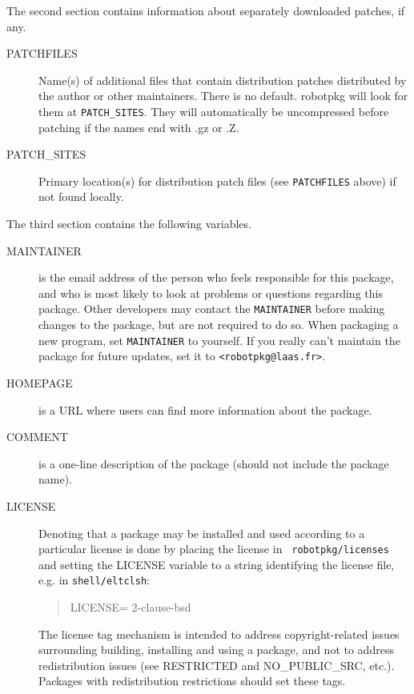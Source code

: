 The second section contains information about separately downloaded patches, if any.

\begin{description}

   \item[PATCHFILES] Name(s) of additional files that contain distribution
   patches distributed by the author or other maintainers. There is no
   default. robotpkg will look for them at {\tt    PATCH\_SITES}. They will
   automatically be uncompressed before patching if    the names end with .gz
   or .Z.

   \item[PATCH\_SITES] Primary location(s) for distribution patch files (see
   {\tt PATCHFILES} above) if not found locally.

\end{description}

The third section contains the following variables.

\begin{description}

   \item[MAINTAINER] is the email address of the person who feels responsible
   for this package, and who is most likely to look at problems or questions
   regarding this package. Other developers may contact the {\tt MAINTAINER}
   before making changes to the package, but are not required to do so. When
   packaging a new program, set {\tt MAINTAINER} to yourself. If you really
   can't maintain the package for future updates, set it to
   {\tt \string<robotpkg@laas.fr\string>}.

   \item[HOMEPAGE] is a URL where users can find more information about the
   package.

   \item[COMMENT] is a one-line description of the package (should not include
   the package name).

   \item[LICENSE] Denoting that a package may be installed and used according
   to a particular license is done by placing the license in {\tt
   robotpkg/licenses} and setting the LICENSE variable to a string identifying
   the license file, e.g. in {\tt shell/eltclsh}:
   \begin{quote}
      LICENSE=		2-clause-bsd
   \end{quote}

   The license tag mechanism is intended to address copyright-related issues
   surrounding building, installing and using a package, and not to address
   redistribution issues (see RESTRICTED and NO\_PUBLIC\_SRC, etc.). Packages
   with redistribution restrictions should set these tags.

\end{description}


